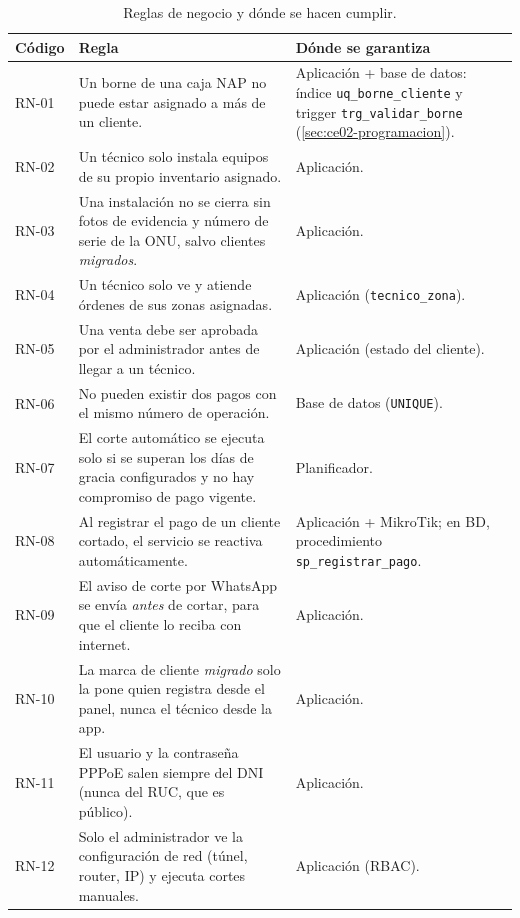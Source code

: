 \begin{table}[H]
\centering
\caption{Reglas de negocio y dónde se hacen cumplir.}
\label{tab:ce02-reglas}
\small
\begin{tabularx}{\textwidth}{L{1.2cm}XL{3.4cm}}
\toprule
\textbf{Código} & \textbf{Regla} & \textbf{Dónde se garantiza} \\
\midrule
RN-01 & Un borne de una caja NAP no puede estar asignado a más de un cliente. & Aplicación + base de datos: índice \texttt{uq\_borne\_cliente} y trigger \texttt{trg\_validar\_borne} (\cref{sec:ce02-programacion}). \\
RN-02 & Un técnico solo instala equipos de su propio inventario asignado. & Aplicación. \\
RN-03 & Una instalación no se cierra sin fotos de evidencia y número de serie de la ONU, salvo clientes \emph{migrados}. & Aplicación. \\
RN-04 & Un técnico solo ve y atiende órdenes de sus zonas asignadas. & Aplicación (\texttt{tecnico\_zona}). \\
RN-05 & Una venta debe ser aprobada por el administrador antes de llegar a un técnico. & Aplicación (estado del cliente). \\
RN-06 & No pueden existir dos pagos con el mismo número de operación. & Base de datos (\texttt{UNIQUE}). \\
RN-07 & El corte automático se ejecuta solo si se superan los días de gracia configurados y no hay compromiso de pago vigente. & Planificador. \\
RN-08 & Al registrar el pago de un cliente cortado, el servicio se reactiva automáticamente. & Aplicación + MikroTik; en BD, procedimiento \texttt{sp\_registrar\_pago}. \\
RN-09 & El aviso de corte por WhatsApp se envía \emph{antes} de cortar, para que el cliente lo reciba con internet. & Aplicación. \\
RN-10 & La marca de cliente \emph{migrado} solo la pone quien registra desde el panel, nunca el técnico desde la app. & Aplicación. \\
RN-11 & El usuario y la contraseña PPPoE salen siempre del DNI (nunca del RUC, que es público). & Aplicación. \\
RN-12 & Solo el administrador ve la configuración de red (túnel, router, IP) y ejecuta cortes manuales. & Aplicación (RBAC). \\
\bottomrule
\end{tabularx}
\end{table}

